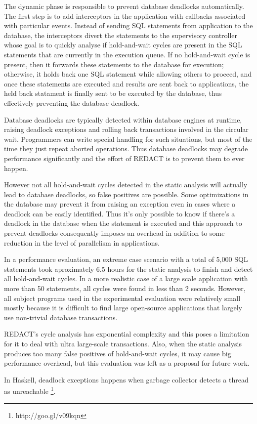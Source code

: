 The dynamic phase is responsible to prevent database deadlocks automatically. The first step is to add interceptors in the application with callbacks associated with particular events.
Instead of sending SQL statements from application to the database, the interceptors divert the statements to the supervisory controller whose goal is to quickly analyse if
hold-and-wait cycles are present in the SQL statements that are currently in the execution queue. If no hold-and-wait cycle is present, then it forwards these statements to the
database for execution; otherwise, it holds back one SQL statement while allowing others to proceed, and once these statements are executed and results are sent back to applications,
the held back statament is finally sent to be executed by the database, thus effectively preventing the database deadlock.

Database deadlocks are typically detected within database engines at runtime, raising deadlock exceptions and rolling back transactions involved in the circular wait. Programmers
can write special handling for such situations, but most of the time they just repeat aborted operations. Thus database deadlocks may degrade performance significantly and the
effort of REDACT is to prevent them to ever happen.

However not all hold-and-wait cycles detected in the static analysis will actually lead to database deadlocks, so false positives are possible.
Some optimizations in the database may prevent it from raising an exception even in cases where a deadlock can be easily identified.
Thus it's only possible to know if there's a deadlock in the database when the statement is executed and this approach to prevent deadlocks
consequently imposes an overhead in addition to some reduction in the level of parallelism in applications.

In a performance evaluation, an extreme case scenario with a total of 5,000 SQL statements took aproximately 6.5 hours for the static analysis to finish and detect all hold-and-wait
cycles. In a more realistic case of a large scale application with more than 50 statements, all cycles were found in less than 2 seconds. However, all subject programs used in the
experimental evaluation were relatively small mostly because it is difficult to find large open-source applications that largely use non-trivial database transactions.

REDACT's cycle analysis has exponential complexity and this poses a limitation for it to deal with ultra large-scale transactions. Also, when the static analysis
produces too many false positives of hold-and-wait cycles, it may cause big performance overhead, but this evaluation was left as a proposal for future work.

In Haskell, deadlock exceptions happens when garbage collector detects a thread as unreachable \footnote{http://goo.gl/v09kqn}.
